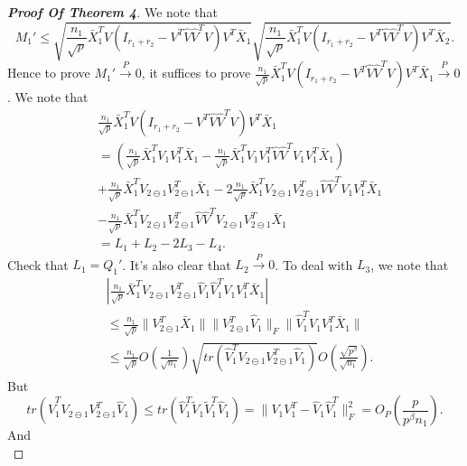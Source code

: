\begin{proof}[\textbf{Proof Of Theorem 4}]
We note that 
\begin{equation*}
M_1'\leq\sqrt{\frac{n_1}{\sqrt{p}}\bar{X}_1^T V(I_{r_1+r_2}-V^T\hat{V}\hat{V}^T V)V^T \bar{X}_1}\sqrt{\frac{n_1}{\sqrt{p}}\bar{X}_1^T V(I_{r_1+r_2}-V^T\hat{V}\hat{V}^T V)V^T \bar{X}_2}.
\end{equation*}
Hence to prove $M_1'\xrightarrow{P} 0$, it suffices to prove $\frac{n_1}{\sqrt{p}}\bar{X}_1^T V(I_{r_1+r_2}-V^T\hat{V}\hat{V}^T V)V^T \bar{X}_1\xrightarrow{P}0$. 
We note that
\begin{equation*}
\begin{aligned}
&\frac{n_1}{\sqrt{p}}\bar{X}_1^T V(I_{r_1+r_2}-V^T\hat{V}\hat{V}^T V)V^T \bar{X}_1\\
&=(\frac{n_1}{\sqrt{p}}\bar{X}_1^T V_1V_1^T \bar{X}_1-\frac{n_1}{\sqrt{p}}\bar{X}_1^T V_1V_1^T \hat{V}\hat{V}^T V_1 V_1^T \bar{X}_1)
\\
&+\frac{n_1}{\sqrt{p}}\bar{X}_1^T V_{2\ominus 1}V_{2\ominus 1}^T \bar{X}_1-
2\frac{n_1}{\sqrt{p}}\bar{X}_1^T V_{2\ominus 1}V_{2\ominus 1}^T \hat{V}\hat{V}^T V_1 V_1^T \bar{X}_1
\\
&-\frac{n_1}{\sqrt{p}}\bar{X}_1^T V_{2\ominus 1}V_{2\ominus 1}^T \hat{V}\hat{V}^T V_{2\ominus 1}V_{2\ominus 1}^T\bar{X}_1
\\
&=L_1+L_2-2L_3-L_4.
\end{aligned}
\end{equation*}
Check that $L_1=Q_1'$. It's also clear that $L_2\xrightarrow{P}0$. To deal with $L_3$, we note that
\begin{equation}\label{xiaojiqiao1}
\begin{aligned}
    &|\frac{n_1}{\sqrt{p}}\bar{X}_1^T V_{2\ominus 1}V_{2\ominus 1}^T \hat{V}_1\hat{V}_1^T V_1 V_1^T \bar{X}_1|
\\
    &\leq \frac{n_1}{\sqrt{p}}\|V_{2\ominus 1}^T\bar{X}_1\|\|V^T_{2\ominus 1}\hat{V}_1\|_F\|\hat{V}_1^T V_1{V}_1^T\bar{X}_1\|\\
&\leq
\frac{n_1}{\sqrt{p}}O(\frac{1}{\sqrt{n_1}})\sqrt{tr(\hat{V}_1^T V_{2\ominus 1}V_{2\ominus 1}^T\hat{V}_1)}O(\frac{\sqrt{p^{\beta}}}{\sqrt{n_1}}).
\end{aligned}
\end{equation}
But 
\begin{equation*}
tr(\hat{V}_1^T V_{2\ominus 1}V_{2\ominus 1}^T\hat{V}_1)\leq tr(\hat{V}_1^T \tilde{V}_1\tilde{V}_1^T\hat{V}_1)=\|V_1V_1^T- \hat{V}_1\hat{V}_1^T\|_F^2=O_P(\frac{p}{p^{\beta}n_1}).
\end{equation*}
And
\begin{equation}\label{xiaojiqiao2}

\end{equation}
\end{proof}
